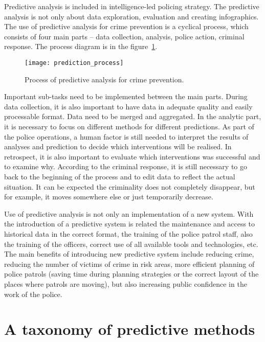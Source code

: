 \documentclass[thesis=M,english]{FITthesis}[2012/10/20]
\begin{document}
Predictive analysis is included in intelligence-led policing strategy.\cite[xviii]{PP13} The predictive analysis is not only about data exploration, evaluation and creating infographics. The use of predictive analysis for crime prevention is a cyclical process, which consists of four main parts -- data collection, analysis, police action, criminal response. The process diagram is in the figure~\ref{fig:ledprocess}.

\begin{figure}[ht]\centering
    \texttt{[image: prediction\_process]}
    \caption{Process of predictive analysis for crime prevention\cite[xviii]{PP13}.}\label{fig:ledprocess}
\end{figure}

Important sub-tasks need to be implemented between the main parts.\cite[13--15]{PP13} During data collection, it is also important to have data in adequate quality and easily processable format. Data need to be merged and aggregated. In the analytic part, it is necessary to focus on different methods for different predictions. As part of the police operations, a human factor is still needed to interpret the results of analyses and prediction to decide which interventions will be realised. In retrospect, it is also important to evaluate which interventions was successful and to examine why. According to the criminal response, it is still necessary to go back to the beginning of the process and to edit data to reflect the actual situation. It can be expected the criminality does not completely disappear, but for example, it moves somewhere else or just temporarily decrease.

Use of predictive analysis is not only an implementation of a new system. With the introduction of a predictive system is related the maintenance and access to historical data in the correct format, the training of the police patrol staff, also the training of the officers, correct use of all available tools and technologies, etc. The main benefits of introducing new predictive system include reducing crime, reducing the number of victims of crime in risk areas, more efficient planning of police patrols (saving time during planning strategies or the correct layout of the places where patrols are moving), but also increasing public confidence in the work of the police.\cite[290--294]{futuremaps} 

\section{A taxonomy of predictive methods}
\end{document}
